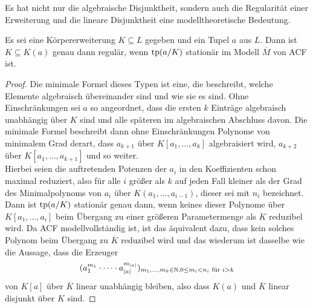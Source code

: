     Es hat nicht nur die algebraische Disjunktheit, sondern auch die Regularität einer Erweiterung und die lineare Disjunktheit eine modelltheoretische Bedeutung.
    
    \begin{lemma}
    	Es sei eine Körpererweiterung $K\subseteq L$ gegeben und ein Tupel $a$ aus $L$. Dann ist $K\subseteq K(a)$ genau dann regulär, wenn $\operatorname{tp}(a/K)$ stationär im Modell $\overline{M}$ von ACF ist.
    \end{lemma}
    \begin{proof}
    	Die minimale Formel dieses Typen ist eine, die beschreibt, welche Elemente algebraisch übereinander sind und wie sie es sind. Ohne Einschränkungen sei $a$ so angeordnet, dass die ersten $k$ Einträge algebraisch unabhängig über $K$ sind und alle späteren im algebraischen Abschluss davon. Die minimale Formel beschreibt dann ohne Einschränkungen Polynome von minimalem Grad derart, dass $a_{k+1}$ über $K[a_1,\dots,a_k]$ algebraisiert wird, $a_{k+2}$ über $K[a_1,\dots,a_{k+1}]$ und so weiter.\\
    	Hierbei seien die auftretenden Potenzen der $a_i$ in den Koeffizienten schon maximal reduziert, also für alle $i$ größer als $k$ auf jeden Fall kleiner als der Grad des Minimalpolynoms von $a_i$ über $K(a_1,\dots,a_{i-1})$, dieser sei mit $n_i$ bezeichnet. Dann ist $\operatorname{tp}(a/K)$ stationär genau dann, wenn keines dieser Polynome über $K[a_1,\dots,a_i]$ beim Übergang zu einer größeren Parametermenge als $K$ reduzibel wird.\newpage
    	Da ACF modellvollständig ist, ist das äquivalent dazu, dass kein solches Polynom beim Übergang zu $\overline{K}$ reduzibel wird und das wiederum ist dasselbe wie die Aussage, dass die Erzeuger $$(a_1^{m_1}\cdot\dots\cdot a_{\left| a \right|}^{m_{\left| a \right|}})_{m_1,\dots,m_k\in\mathbb{N},0\leq m_i<n_i\text{ für }i>k}$$ von $K[a]$ über $\overline{K}$ linear unabhängig bleiben, also dass $K(a)$ und $\overline{K}$ linear disjunkt über $K$ sind.
    \end{proof}
    
